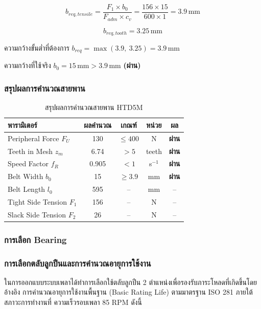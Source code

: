 \begin{equation}
  b_{req,tensile} = \frac{F_1 \times b_0}{F_{adm} \times c_v}
                 = \frac{156 \times 15}{600 \times 1}
                 = 3.9\,\text{mm}
  \label{eq:belt_breq_tensile}
\end{equation}

\begin{equation}
  b_{req,tooth} = 3.25\,\text{mm}
  \label{eq:belt_breq_tooth}
\end{equation}

ความกว้างขั้นต่ำที่ต้องการ
$b_{req} = \max(3.9,\ 3.25) = 3.9\,\text{mm}$

ความกว้างที่ใช้จริง $b_0 = 15\,\text{mm} > 3.9\,\text{mm}$
\textbf{(ผ่าน)}

\subsubsection{สรุปผลการคำนวณสายพาน}

\begin{table}[H]
  \centering
  \caption{สรุปผลการคำนวณสายพาน HTD5M}
  \label{tab:belt_summary}
  \begin{tabular}{lcccc}
    \toprule
    พารามิเตอร์ & ผลคำนวณ & เกณฑ์ & หน่วย & ผล \\
    \midrule
    Peripheral Force $F_U$
      & 130 & $\leq 400$ & N & \textbf{ผ่าน} \\
    Teeth in Mesh $z_m$
      & 6.74 & $> 5$ & teeth & \textbf{ผ่าน} \\
    Speed Factor $f_R$
      & 0.905 & $< 1$ & s$^{-1}$ & \textbf{ผ่าน} \\
    Belt Width $b_0$
      & 15 & $\geq 3.9$ & mm & \textbf{ผ่าน} \\
    Belt Length $l_0$
      & 595 & -- & mm & -- \\
    Tight Side Tension $F_1$
      & 156 & -- & N & -- \\
    Slack Side Tension $F_2$
      & 26  & -- & N & -- \\
    \bottomrule
  \end{tabular}
\end{table}



\subsubsection{การเลือก Bearing}
\label{subsubsec:bearing_selection}
\subsubsection{การเลือกตลับลูกปืนและการคำนวณอายุการใช้งาน}
ในการออกแบบระบบเพลาได้ทำการเลือกใช้ตลับลูกปืน 2 ตำแหน่งเพื่อรองรับภาระโหลดที่เกิดขึ้นโดยอ้างอิง การคำนวณอายุการใช้งานพื้นฐาน (Basic Rating Life) ตามมาตรฐาน ISO 281 ภายใต้สภาวะการทำงานที่ ความเร็วรอบเพลา 85 RPM ดังนี้

